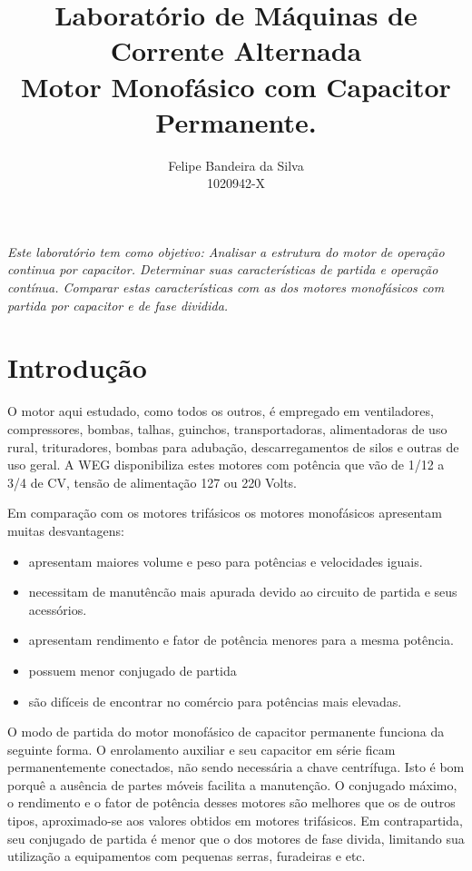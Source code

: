 \documentclass[paper=a4, fontsize=11pt]{article}
\title{Laboratório de Máquinas de Corrente Alternada\\Motor Monofásico com Capacitor Permanente.}
\author{Felipe Bandeira da Silva\\1020942-X}
\begin{document}
\maketitle


\textit{Este laboratório tem como objetivo: Analisar a estrutura do motor de operação continua por capacitor. Determinar suas características de partida e operação contínua. Comparar estas características com as dos motores monofásicos com partida por capacitor e de fase dividida.}

\newpage

\tableofcontents

\newpage



\newpage
\section{Introdução}

O motor aqui estudado, como todos os outros, é empregado em ventiladores, 
compressores, bombas, talhas, guinchos, transportadoras, alimentadoras de uso
rural, trituradores, bombas para adubação, descarregamentos de silos e 
outras de uso geral. A WEG disponibiliza estes motores com potência 
que vão de 1/12 a 3/4 de CV, tensão de alimentação 127 ou 220 Volts.

Em comparação com os motores trifásicos os motores monofásicos 
apresentam muitas desvantagens:

\begin{itemize}
    \item apresentam maiores volume e peso para potências e velocidades 
            iguais.
    \item necessitam de manutêncão mais apurada devido ao circuito de 
            partida e seus acessórios.
    \item apresentam rendimento e fator de potência menores para a mesma potência.
    \item possuem menor conjugado de partida
    \item são difíceis de encontrar no comércio para potências mais elevadas.
\end{itemize}

O modo de partida do motor monofásico de capacitor permanente funciona da 
seguinte forma. O enrolamento auxiliar e seu capacitor em série ficam permanentemente
conectados, não sendo necessária a chave centrífuga. Isto é bom porquê a 
ausência de partes móveis facilita a manutenção.
O conjugado máximo, o rendimento e o fator de potência desses motores são 
melhores que os de outros tipos, aproximado-se aos valores obtidos em 
motores trifásicos. Em contrapartida, seu conjugado de partida  é menor
que o dos motores de fase divida, limitando sua utilização a equipamentos 
com pequenas serras, furadeiras e etc.
\end{document}
